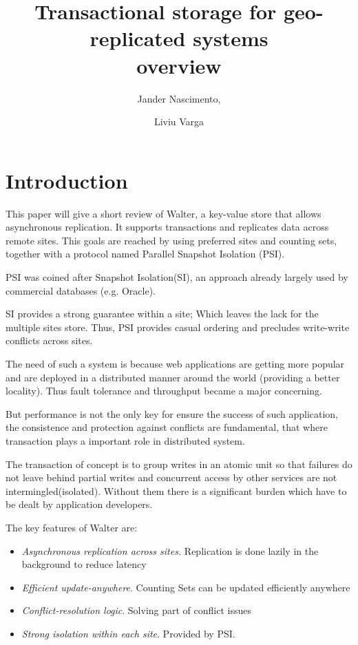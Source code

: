 \documentclass[a4paper]{article}
\begin{document}
\title{Transactional storage for geo-replicated systems \\ overview}

\author{Jander Nascimento,
\and Liviu Varga}

\maketitle


\section{Introduction}
This paper will give a short review of Walter, a key-value store that allows asynchronous replication. It supports transactions and replicates data across remote sites. This goals are reached by using preferred sites and counting sets, together with a protocol named Parallel Snapshot Isolation (PSI). 

PSI was coined after Snapshot Isolation(SI), an approach already largely used by commercial databases (e.g. Oracle). 

SI provides a strong guarantee within a site; Which leaves the lack for the multiple sites store. Thus, PSI provides casual ordering and precludes write-write conflicts across sites.

The need of such a system is because web applications are getting more popular and are deployed in a distributed  manner around the world (providing a better locality). Thus fault tolerance and throughput became a major concerning. 

But performance is not the only key for ensure the success of such application, the consistence and protection against conflicts are fundamental, that where transaction plays a important role in distributed system. 

The transaction of concept is to group writes in an atomic unit so that failures do not leave behind partial writes and concurrent access by other services are not intermingled(isolated). Without them there is a significant burden which have to be dealt by application developers. 

The key features of Walter are:

\begin{itemize}
\item \textit{Asynchronous replication across sites.} Replication is done lazily in the background to reduce latency
\item \textit{Efficient update-anywhere}. Counting Sets can be updated efficiently anywhere
\item \textit{Conflict-resolution logic}. Solving part of conflict issues
\item \textit{Strong isolation within each site}. Provided by PSI.
\end{itemize}
          
\end{document}
